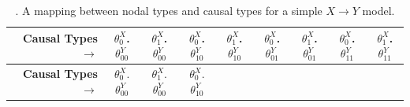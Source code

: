 \documentclass[
  12pt,
]{book}
\begin{document}
\begin{longtable}[]{@{}rcccccccc@{}}
\caption{\label{tab:nodalcausalmatrix}. A mapping between nodal types and causal types for a simple \(X \rightarrow Y\) model.}\tabularnewline
\toprule
\begin{minipage}[b]{0.12\columnwidth}\raggedleft
\textbf{Causal Types \(\rightarrow\)}\strut
\end{minipage} & \begin{minipage}[b]{0.08\columnwidth}\centering
\(\theta^X_0\).\(\theta^Y_{00}\)\strut
\end{minipage} & \begin{minipage}[b]{0.08\columnwidth}\centering
\(\theta^X_1\).\(\theta^Y_{00}\)\strut
\end{minipage} & \begin{minipage}[b]{0.08\columnwidth}\centering
\(\theta^X_0\).\(\theta^Y_{10}\)\strut
\end{minipage} & \begin{minipage}[b]{0.08\columnwidth}\centering
\(\theta^X_1\).\(\theta^Y_{10}\)\strut
\end{minipage} & \begin{minipage}[b]{0.08\columnwidth}\centering
\(\theta^X_0\).\(\theta^Y_{01}\)\strut
\end{minipage} & \begin{minipage}[b]{0.08\columnwidth}\centering
\(\theta^X_1\).\(\theta^Y_{01}\)\strut
\end{minipage} & \begin{minipage}[b]{0.08\columnwidth}\centering
\(\theta^X_0\).\(\theta^Y_{11}\)\strut
\end{minipage} & \begin{minipage}[b]{0.08\columnwidth}\centering
\(\theta^X_1\).\(\theta^Y_{11}\)\strut
\end{minipage}\tabularnewline
\midrule
\endfirsthead
\toprule
\begin{minipage}[b]{0.12\columnwidth}\raggedleft
\textbf{Causal Types \(\rightarrow\)}\strut
\end{minipage} & \begin{minipage}[b]{0.08\columnwidth}\centering
\(\theta^X_0\).\(\theta^Y_{00}\)\strut
\end{minipage} & \begin{minipage}[b]{0.08\columnwidth}\centering
\(\theta^X_1\).\(\theta^Y_{00}\)\strut
\end{minipage} & \begin{minipage}[b]{0.08\columnwidth}\centering
\(\theta^X_0\).\(\theta^Y_{10}\)\strut

\end{minipage}
\end{longtable}
\end{document}
